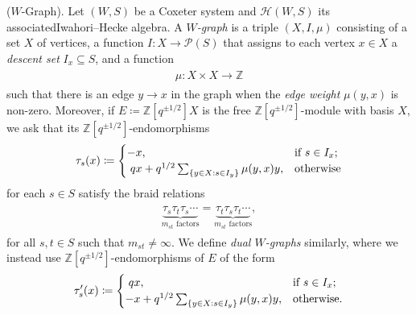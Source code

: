\begin{definition}\textup{($W$-Graph).} Let $(W, S)$ be a Coxeter system and $\mathscr{H}(W, S)$ its associated\linebreak Iwahori--Hecke algebra. A {\em $W$-graph} is a triple $(X, I, \mu)$ consisting of a set $X$ of vertices, a function $I : X \to \mathscr{P}(S)$ that assigns to each vertex $x \in X$ a {\em descent set} $I_x \subseteq S$, and a function
\begin{align*}
\begin{split}
\mu : X \times X \to \mathbb{Z}
\end{split}
\end{align*}
\noindent such that there is an edge $y \to x$ in the graph when the {\em edge weight} $\mu(y, x)$ is non-zero. Moreover, if $E \coloneqq \mathbb{Z}[q^{\pm 1/2}]X$ is the free $\mathbb{Z}[q^{\pm 1/2}]$-module with basis $X$, we ask that its $\mathbb{Z}[q^{\pm 1/2}]$-endomorphisms%
\begin{align*}
\begin{split}
\tau_s(x) \coloneqq \begin{cases}
-x, &\text{if $s \in I_x$;}\\
\nhphantom{$q$}\hphantom{-}qx + q^{1/2}\sum_{\{y \in X : s \in I_y\}} \mu(y, x)y, &\text{otherwise}
\end{cases}
\end{split}
\end{align*}
\noindent for each $s \in S$ satisfy the braid relations
\begin{align*}
\begin{split}
\underbrace{\tau_s\tau_t\tau_s\cdots}_\text{$m_{st}$ factors} = \underbrace{\tau_t\tau_s\tau_t\cdots}_\text{$m_{st}$ factors},
\end{split}
\end{align*}
\noindent for all $s, t \in S$ such that $m_{st} \neq \infty$. We define {\em dual $W$-graphs} similarly, where we instead use $\mathbb{Z}[q^{\pm 1/2}]$-endomorphisms of $E$ of the form
\begin{align*}
\begin{split}
\tau_s'(x) \coloneqq \begin{cases}
\nhphantom{$q$}\hphantom{-}qx, &\text{if $s \in I_x$;}\\
-x + q^{1/2}\sum_{\{y \in X : s \in I_y\}} \mu(y, x)y, &\text{otherwise.}
\end{cases}
\end{split}
\end{align*}
\end{definition}
\newpage

